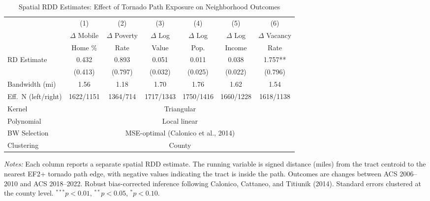 \begin{table}[t]
\centering
\caption{Spatial RDD Estimates: Effect of Tornado Path Exposure on Neighborhood Outcomes}
\label{tab:rdd_main}
\small
\begin{tabular}{lcccccc}
\hline\hline
 & (1) & (2) & (3) & (4) & (5) & (6) \\
 & $\Delta$ Mobile & $\Delta$ Poverty & $\Delta$ Log & $\Delta$ Log & $\Delta$ Log & $\Delta$ Vacancy \\
 & Home \% & Rate & Value & Pop. & Income & Rate \\
\hline
RD Estimate & 0.432 & 0.893 & 0.051 & 0.011 & 0.038 & 1.757** \\
 & (0.413) & (0.797) & (0.032) & (0.025) & (0.022) & (0.796) \\
Bandwidth (mi) & 1.56 & 1.18 & 1.70 & 1.76 & 1.62 & 1.54 \\
Eff.\ N (left/right) & 1622/1151 & 1364/714 & 1717/1343 & 1750/1416 & 1660/1228 & 1618/1138 \\
\hline
Kernel & \multicolumn{6}{c}{Triangular} \\
Polynomial & \multicolumn{6}{c}{Local linear} \\
BW Selection & \multicolumn{6}{c}{MSE-optimal (Calonico et al., 2014)} \\
Clustering & \multicolumn{6}{c}{County} \\
\hline\hline
\end{tabular}
\vspace{0.3em}
\raggedright\footnotesize
\textit{Notes:} Each column reports a separate spatial RDD estimate. The running variable is signed distance (miles) from the tract centroid to the nearest EF2+ tornado path edge, with negative values indicating the tract is inside the path. Outcomes are changes between ACS 2006--2010 and ACS 2018--2022. Robust bias-corrected inference following Calonico, Cattaneo, and Titiunik (2014). Standard errors clustered at the county level. $^{***}p<0.01$, $^{**}p<0.05$, $^{*}p<0.10$.
\end{table}
